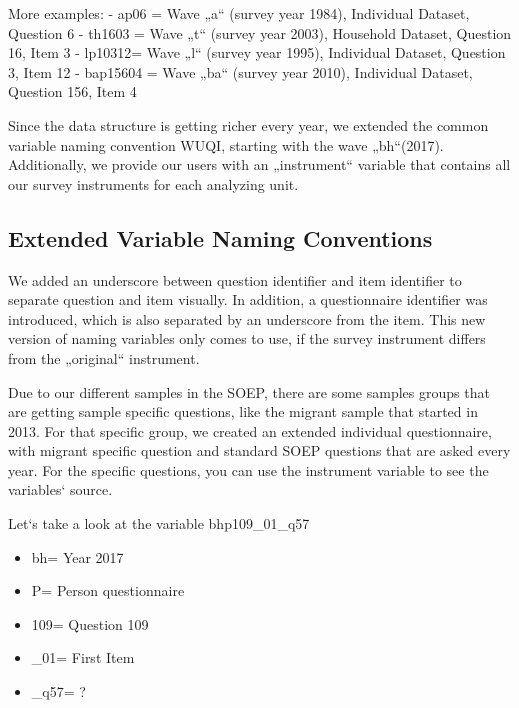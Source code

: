 \documentclass[letterpaper,10pt,openany,onesideH,english]{sphinxmanual}
\begin{document}
More examples:
-       ap06 = Wave „a“ (survey year 1984), Individual Dataset, Question 6
-       th1603 = Wave „t“ (survey year 2003), Household Dataset, Question 16, Item 3
-       lp10312= Wave „l“ (survey year 1995), Individual Dataset, Question 3, Item 12
-       bap15604 = Wave „ba“ (survey year 2010), Individual Dataset, Question 156, Item 4

Since the data structure is getting richer every year, we extended the common variable naming convention WUQI, starting with the wave „bh“(2017).
Additionally, we provide our users with an „instrument“ variable that contains all our survey instruments for each analyzing unit.


\subsection{Extended Variable Naming Conventions}
\label{\detokenize{Principles of Data Structure/index:extended-variable-naming-conventions}}
\begin{figure}[H]
\centering

\noindent{}
\end{figure}

We added an underscore between question identifier and item identifier to separate question and item visually. In addition, a questionnaire identifier was introduced, which is also separated by an underscore from the item. This new version of naming variables only comes to use, if the survey instrument differs from the „original“ instrument.

Due to our different samples in the SOEP, there are some samples groups that are getting sample specific questions, like the migrant sample that started in 2013. For that specific group, we created an extended individual questionnaire, with migrant specific question and standard SOEP questions that are asked every year. For the specific questions, you can use the instrument variable to see the variables{}` source.

Let{}`s take a look at the variable bhp109\_01\_q57
\begin{itemize}
\item {} 
bh= Year 2017

\item {} 
P= Person questionnaire

\item {} 
109= Question 109

\item {} 
\_01= First Item

\item {} 
\_q57= ?

\end{itemize}
\end{document}
